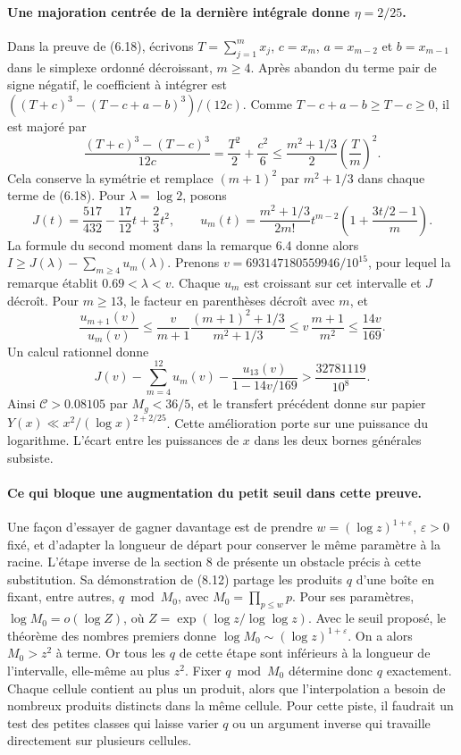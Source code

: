 \documentclass[11pt,a4paper]{article}
\begin{document}
\paragraph{Une majoration centrée de la dernière intégrale donne $\eta=2/25$.}
Dans la preuve de (6.18), écrivons $T=\sum_{j=1}^m x_j$, $c=x_m$,
$a=x_{m-2}$ et $b=x_{m-1}$ dans le simplexe ordonné décroissant,
$m\ge4$. Après abandon du terme pair de signe négatif, le coefficient
à intégrer est $((T+c)^3-(T-c+a-b)^3)/(12c)$. Comme
$T-c+a-b\ge T-c\ge0$, il est majoré par
\[
  \frac{(T+c)^3-(T-c)^3}{12c}
  =\frac{T^2}{2}+\frac{c^2}{6}
  \le \frac{m^2+1/3}{2}\left(\frac{T}{m}\right)^2.
\]
Cela conserve la symétrie et remplace $(m+1)^2$ par $m^2+1/3$
dans chaque terme de (6.18). Pour $\lambda=\log 2$, posons
\[
 J(t)=\frac{517}{432}-\frac{17}{12}t+\frac23t^2,\qquad
 u_m(t)=\frac{m^2+1/3}{2m!}t^{m-2}
             \left(1+\frac{3t/2-1}{m}\right).
\]
La formule du second moment dans la remarque 6.4 donne alors
$I\ge J(\lambda)-\sum_{m\ge4}u_m(\lambda)$.
Prenons $v=693147180559946/10^{15}$, pour lequel la remarque établit
$0.69<\lambda<v$. Chaque $u_m$ est croissant sur cet intervalle et
$J$ décroît. Pour $m\ge13$, le facteur en parenthèses décroît avec
$m$, et
\[
 \frac{u_{m+1}(v)}{u_m(v)}\le
 \frac{v}{m+1}\frac{(m+1)^2+1/3}{m^2+1/3}
 \le v\,\frac{m+1}{m^2}\le \frac{14v}{169}.
\]
Un calcul rationnel donne
\[
 J(v)-\sum_{m=4}^{12}u_m(v)-\frac{u_{13}(v)}{1-14v/169}
 >\frac{32781119}{10^8}.
\]
Ainsi $\mathcal C>0.08105$ par $M_g<36/5$, et le transfert précédent
donne sur papier $Y(x)\ll x^2/(\log x)^{2+2/25}$. Cette amélioration
porte sur une puissance du logarithme. L'écart entre les puissances de
$x$ dans les deux bornes générales subsiste.

\paragraph{Ce qui bloque une augmentation du petit seuil dans cette preuve.}
Une façon d'essayer de gagner davantage est de prendre
$w=(\log z)^{1+\varepsilon}$, $\varepsilon>0$ fixé, et d'adapter la
longueur de départ pour conserver le même paramètre à la racine.
L'étape inverse de la section 8 de \cite{survivors} présente un
obstacle précis à cette substitution. Sa démonstration de (8.12)
partage les produits $q$ d'une boîte en fixant, entre autres,
$q\bmod M_0$, avec $M_0=\prod_{p\le w}p$. Pour ses paramètres,
$\log M_0=o(\log Z)$, où $Z=\exp(\log z/\log\log z)$.
Avec le seuil proposé, le théorème des nombres premiers donne
$\log M_0\sim(\log z)^{1+\varepsilon}$. On a alors $M_0>z^2$ à
terme. Or tous les $q$ de cette étape sont inférieurs à la longueur
de l'intervalle, elle-même au plus $z^2$. Fixer $q\bmod M_0$
détermine donc $q$ exactement. Chaque cellule contient au plus un
produit, alors que l'interpolation a besoin de nombreux produits
distincts dans la même cellule. Pour cette piste, il faudrait un
test des petites classes qui laisse varier $q$ ou un argument inverse
qui travaille directement sur plusieurs cellules.
\end{document}
